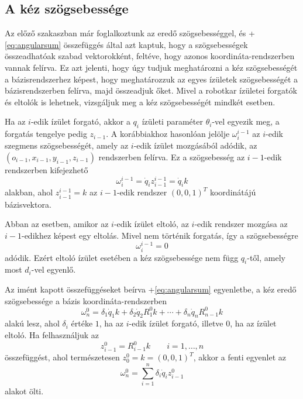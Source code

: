 \documentclass[12pt,a4paper]{report}
\theoremstyle{remark}
\theoremstyle{definition}
\begin{document}
\subsection{A kéz szögsebessége}
Az előző szakaszban már foglalkoztunk az eredő szögsebességgel, és \az+\eqref{eq:angularsum} összefüggés által azt 
kaptuk, hogy a szögsebességek összeadhatóak szabad vektorokként, feltéve, hogy azonos koordináta-rendszerben vannak 
felírva. Ez azt jelenti, hogy úgy tudjuk meghatározni a kéz szögsebességét a bázisrendszerhez képest, hogy 
meghatározzuk az egyes ízületek szögsebességét a bázisrendszerben felírva, majd összeadjuk őket. Mivel a robotkar 
ízületei forgatók és eltolók is lehetnek, vizsgáljuk meg a kéz szögsebességét mindkét esetben.

Ha az $i$-edik ízület forgató, akkor a $q_i$ ízületi paraméter $\theta_i$-vel egyezik meg, a forgatás tengelye pedig 
$z_{i-1}$. A korábbiakhoz hasonlóan jelölje $\omega^{i-1}_{i}$ az $i$-edik szegmens szögsebességét, amely az 
$i$-edik ízület mozgásából adódik, az $(o_{i-1}, x_{i-1}, y_{i-1}, z_{i-1})$ rendszerben felírva. Ez a szögsebesség 
az $i-1$-edik rendszerben kifejezhető
\begin{equation}
\omega^{i-1}_{i} = \dot{q}_i z^{i-1}_{i-1} = \dot{q}_i k
\end{equation}
alakban, ahol $z^{i-1}_{i-1} = k$ az $i-1$-edik rendszer $(0, 0, 1)^T$ koordinátájú bázisvektora.

Abban az esetben, amikor az $i$-edik ízület eltoló, az $i$-edik rendszer mozgása az $i-1$-edikhez képest egy 
eltolás. Mivel nem történik forgatás, így a szögsebességre
\begin{equation}
\omega^{i-1}_{i} = 0
\end{equation}
adódik. Ezért eltoló ízület esetében a kéz szögsebessége nem függ $q_i$-től, amely most $d_i$-vel egyenlő.

Az imént kapott összefüggéseket beírva \az+\eqref{eq:angularsum} egyenletbe, a kéz eredő szögsebessége a bázis 
koordináta-rendszerben
\begin{equation}
\omega^{0}_{n} = \delta_1\dot{q}_1 k + \delta_2\dot{q}_2 R^{0}_{1}k + \cdots + \delta_n\dot{q}_n R^{0}_{n-1}k
\end{equation}
alakú lesz, ahol $\delta_i$ értéke $1$, ha az $i$-edik ízület forgató, illetve $0$, ha az ízület eltoló. Ha 
felhasználjuk az
\begin{equation}
z^{0}_{i-1} = R^{0}_{i-1}k \qquad i = 1, \ldots, n
\end{equation}
összefüggést, ahol természetesen $z^{0}_{0} = k = (0, 0, 1)^T$, akkor a fenti egyenlet az
\begin{equation}
\omega^{0}_{n} = \sum^{n}_{i=1} \delta_i \dot{q}_i z^{0}_{i-1}
\end{equation}
alakot ölti.
\end{document}
